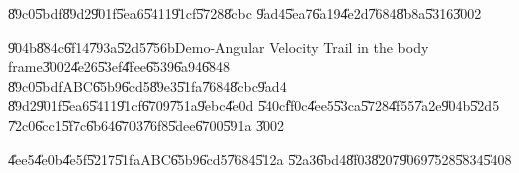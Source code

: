 \begin{case}
\U{89c0}\U{5bdf}\U{89d2}\U{901f}\U{5ea6}\U{5411}\U{91cf}\U{5728}\U{8cbc}%
\U{9ad4}\U{5ea7}\U{6a19}\U{4e2d}\U{7684}\U{8b8a}\U{5316}\U{3002}
\end{case}

\U{904b}\U{884c}\U{6f14}\U{793a}\U{52d5}\U{756b}Demo-Angular Velocity Trail
in the body frame\U{3002}\U{4e26}\U{53ef}\U{4fee}\U{6539}\U{6a94}\U{6848}%
\U{89c0}\U{5bdf}ABC\U{65b9}\U{6cd5}\U{89e3}\U{51fa}\U{7684}\U{8cbc}\U{9ad4}%
\U{89d2}\U{901f}\U{5ea6}\U{5411}\U{91cf}\U{6709}\U{751a}\U{9ebc}\U{4e0d}%
\U{540c}\U{ff0c}\U{4ee5}\U{53ca}\U{5728}\U{4f55}\U{7a2e}\U{904b}\U{52d5}%
\U{72c0}\U{6cc1}\U{5f7c}\U{6b64}\U{6703}\U{76f8}\U{5dee}\U{6700}\U{591a}%
\U{3002}

\begin{case}
\U{4ee5}\U{4e0b}\U{4e5f}\U{5217}\U{51fa}ABC\U{65b9}\U{6cd5}\U{7684}\U{512a}%
\U{52a3}\U{6bd4}\U{8f03}\U{8207}\U{9069}\U{7528}\U{5834}\U{5408}
\end{case}

%
\begin{center}

\end{center}%

%
